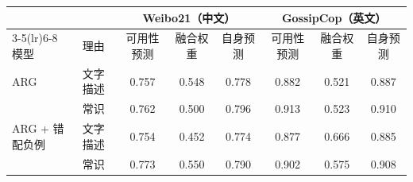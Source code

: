 \begin{tabular}{llcccccc}
\toprule
 & & \multicolumn{3}{c}{Weibo21（中文）} & \multicolumn{3}{c}{GossipCop（英文）} \\
\cmidrule(lr){3-5}\cmidrule(lr){6-8}
模型 & 理由 & 可用性预测 & 融合权重 & 自身预测 & 可用性预测 & 融合权重 & 自身预测 \\
\midrule
ARG & 文字描述 & 0.757 & 0.548 & 0.778 & 0.882 & 0.521 & 0.887 \\
 & 常识 & 0.762 & 0.500 & 0.796 & 0.913 & 0.523 & 0.910 \\
ARG + 错配负例 & 文字描述 & 0.754 & 0.452 & 0.774 & 0.877 & 0.666 & 0.885 \\
 & 常识 & 0.773 & 0.550 & 0.790 & 0.902 & 0.575 & 0.908 \\
\bottomrule
\end{tabular}
